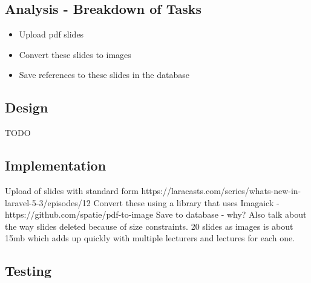 \documentclass{article}
\begin{document}
\subsection{Analysis - Breakdown of Tasks}
\begin{itemize}
	\item Upload pdf slides
	\item Convert these slides to images
	\item Save references to these slides in the database
\end{itemize}
\subsection{Design}
TODO
\subsection{Implementation}
Upload of slides with standard form https://laracasts.com/series/whats-new-in-laravel-5-3/episodes/12
Convert these using a library that uses Imagaick - https://github.com/spatie/pdf-to-image
Save to database - why? Also talk about the way slides deleted because of size constraints. 20 slides as images is about 15mb which adds up quickly with multiple lecturers and lectures for each one.
\subsection{Testing}
\newpage

%
%
\end{document}
